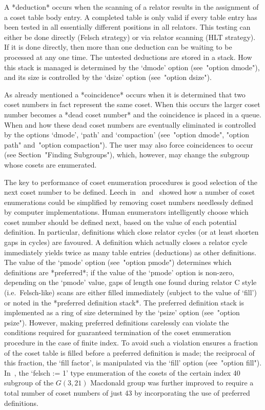 A *deduction* occurs when the scanning of  a  relator
results in the assignment of a coset table  body  entry.  A  completed
table is only valid if every  table  entry  has  been  tested  in  all
essentially different positions in  all  relators.  This  testing  can
either be done directly (Felsch strategy) or via relator scanning (HLT
strategy). If it is done directly, then more than one deduction can be
waiting to be processed at any one time. The untested  deductions  are
stored in a stack. How this stack is  managed  is  determined  by  the
`dmode' option (see~"option dmode"), and its size is controlled by the
`dsize' option (see~"option dsize").

As already mentioned a *coincidence* occurs when it
is determined that two coset numbers in fact represent the same coset.
When this occurs  the  larger  coset  number  becomes  a  *dead  coset
number* and the coincidence is placed in  a
queue. When and how these dead coset numbers are eventually eliminated
is  controlled  by  the  options  `dmode',  `path'  and   `compaction'
(see~"option dmode", "option path" and~"option compaction"). The  user
may  also  force   coincidences   to   occur   (see   Section~"Finding
Subgroups"), which, however, may change the subgroup whose cosets  are
enumerated.

The key  to  performance  of  coset  enumeration  procedures  is  good
selection  of  the  next   coset   number   to   be   defined.   Leech
in~\cite{Lee77}  and~\cite{Lee84}  showed  how  a  number   of   coset
enumerations could be simplified by removing coset numbers  needlessly
defined by computer implementations. Human  enumerators  intelligently
choose which coset number should be defined next, based on  the  value
of each potential definition. In particular, definitions  which  close
relator cycles (or at least shorten gaps in cycles)  are  favoured.  A
definition which actually closes a relator  cycle  immediately  yields
twice as many table entries (deductions)  as  other  definitions.  The
value of the `pmode'  option  (see~"option  pmode")  determines  which
definitions are *preferred*; if the value of  the  `pmode'  option  is
non-zero, depending on the `pmode' value, gaps  of  length  one  found
during relator C style  (i.e.~Felsch-like)  scans  are  either  filled
immediately  (subject  to  the  value  of  `fill')  or  noted  in  the
*preferred definition stack*.  The
preferred definition stack is implemented as a ring of size determined
by the `psize' option (see~"option psize"). However, making  preferred
definitions  carelessly  can  violate  the  conditions  required   for
guaranteed termination of the coset enumeration procedure in the  case
of finite index. To avoid such a violation {\ACE} ensures  a  fraction
of the coset table is filled before a preferred  definition  is  made;
the reciprocal of this fraction, the `fill factor', is manipulated via
the `fill' option (see~"option fill"). In~\cite{Hav91}, the `felsch :=
1' type enumeration of the cosets of the certain index 40 subgroup  of
the $G(3,21)$ Macdonald group was further improved to require a  total
number of coset numbers  of  just  43  by  incorporating  the  use  of
preferred definitions.

